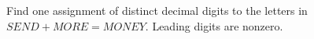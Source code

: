 Find one assignment of distinct decimal digits to the letters in $SEND+MORE=MONEY$. Leading digits are nonzero.
